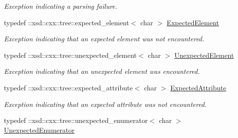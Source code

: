 \begin{DoxyCompactItemize}
\begin{DoxyCompactList}\small\item\em Exception indicating a parsing failure. \item\end{DoxyCompactList}\item 
\hypertarget{namespacexml__schema_affcd8b87d336cb78c21a358711d4e876}{
typedef ::xsd::cxx::tree::expected\_\-element$<$ char $>$ \hyperlink{namespacexml__schema_affcd8b87d336cb78c21a358711d4e876}{ExpectedElement}}
\label{namespacexml__schema_affcd8b87d336cb78c21a358711d4e876}

\begin{DoxyCompactList}\small\item\em Exception indicating that an expected element was not encountered. \item\end{DoxyCompactList}\item 
\hypertarget{namespacexml__schema_a9d851681cf40547856f7e7ef2c2e1f2f}{
typedef ::xsd::cxx::tree::unexpected\_\-element$<$ char $>$ \hyperlink{namespacexml__schema_a9d851681cf40547856f7e7ef2c2e1f2f}{UnexpectedElement}}
\label{namespacexml__schema_a9d851681cf40547856f7e7ef2c2e1f2f}

\begin{DoxyCompactList}\small\item\em Exception indicating that an unexpected element was encountered. \item\end{DoxyCompactList}\item 
\hypertarget{namespacexml__schema_a78581d3d4ffe1356dfe8802b25cda56c}{
typedef ::xsd::cxx::tree::expected\_\-attribute$<$ char $>$ \hyperlink{namespacexml__schema_a78581d3d4ffe1356dfe8802b25cda56c}{ExpectedAttribute}}
\label{namespacexml__schema_a78581d3d4ffe1356dfe8802b25cda56c}

\begin{DoxyCompactList}\small\item\em Exception indicating that an expected attribute was not encountered. \item\end{DoxyCompactList}\item 
\hypertarget{namespacexml__schema_afddcc3f30878e928671a15151128783b}{
typedef ::xsd::cxx::tree::unexpected\_\-enumerator$<$ char $>$ \hyperlink{namespacexml__schema_afddcc3f30878e928671a15151128783b}{UnexpectedEnumerator}}
\label{namespacexml__schema_afddcc3f30878e928671a15151128783b}


\end{DoxyCompactItemize}
